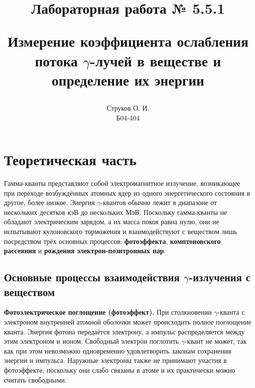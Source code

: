 \documentclass[12pt,a4paper]{article}
\begin{document}
\title{\begin{center}Лабораторная работа № 5.5.1\end{center}
Измерение коэффициента ослабления потока $\gamma$-лучей в веществе и определение их энергии}
\author{Струков О. И. \\ Б04-404}
\date{}

\thispagestyle{empty}
\maketitle
\newpage
{}

\section*{Теоретическая часть}

Гамма-кванты представляют собой электромагнитное излучение, возникающее при переходе возбуждённых атомных ядер из одного энергетического состояния в другое, более низкое. Энергия $\gamma$-квантов обычно лежит в диапазоне от нескольких десятков кэВ до нескольких МэВ. Поскольку гамма-кванты не обладают электрическим зарядом, а их масса покоя равна нулю, они не испытывают кулоновского торможения и взаимодействуют с веществом лишь посредством трёх основных процессов: \textbf{фотоэффекта}, \textbf{комптоновского рассеяния} и \textbf{рождения электрон-позитронных пар}.

\subsection*{Основные процессы взаимодействия $\gamma$-излучения с веществом}

\textbf{Фотоэлектрическое поглощение (фотоэффект).} При столкновении $\gamma$-кванта с электроном внутренней атомной оболочки может происходить полное поглощение кванта. Энергия фотона передаётся электрону, а импульс распределяется между этим электроном и ионом. Свободный электрон поглотить $\gamma$-квант не может, так как при этом невозможно одновременно удовлетворить законам сохранения энергии и импульса. Наружные электроны также не принимают участия в фотоэффекте, поскольку они слабо связаны в атоме и их практически можно считать свободными.
\end{document}
